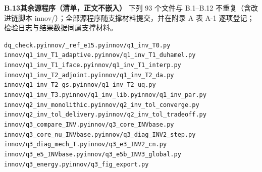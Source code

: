 \noindent\textbf{B.13\quad 其余源程序（清单，正文不嵌入）}
\noindent\footnotesize 下列 93 个文件与 B.1–B.12 不重复（含改进链脚本 innov/）；全部源程序随支撑材料提交，并在附录 A 表 A-1 逐项登记；检验日志与结果数据同属支撑材料。
\begingroup\raggedright\sloppy
\noindent \texttt{dq\_\allowbreak{}check.py}\quad \texttt{innov/\allowbreak{}\_\allowbreak{}ref\_\allowbreak{}e15.py}\quad \texttt{innov/\allowbreak{}q1\_\allowbreak{}inv\_\allowbreak{}T0.py}
\noindent \texttt{innov/\allowbreak{}q1\_\allowbreak{}inv\_\allowbreak{}T1\_\allowbreak{}adaptive.py}\quad \texttt{innov/\allowbreak{}q1\_\allowbreak{}inv\_\allowbreak{}T1\_\allowbreak{}duhamel.py}
\noindent \texttt{innov/\allowbreak{}q1\_\allowbreak{}inv\_\allowbreak{}T1\_\allowbreak{}iface.py}\quad \texttt{innov/\allowbreak{}q1\_\allowbreak{}inv\_\allowbreak{}T1\_\allowbreak{}interp.py}
\noindent \texttt{innov/\allowbreak{}q1\_\allowbreak{}inv\_\allowbreak{}T2\_\allowbreak{}adjoint.py}\quad \texttt{innov/\allowbreak{}q1\_\allowbreak{}inv\_\allowbreak{}T2\_\allowbreak{}da.py}
\noindent \texttt{innov/\allowbreak{}q1\_\allowbreak{}inv\_\allowbreak{}T2\_\allowbreak{}gs.py}\quad \texttt{innov/\allowbreak{}q1\_\allowbreak{}inv\_\allowbreak{}T2\_\allowbreak{}uq.py}
\noindent \texttt{innov/\allowbreak{}q1\_\allowbreak{}inv\_\allowbreak{}T3.py}\quad \texttt{innov/\allowbreak{}q1\_\allowbreak{}inv\_\allowbreak{}lib.py}\quad \texttt{innov/\allowbreak{}q1\_\allowbreak{}inv\_\allowbreak{}par.py}
\noindent \texttt{innov/\allowbreak{}q2\_\allowbreak{}inv\_\allowbreak{}monolithic.py}\quad \texttt{innov/\allowbreak{}q2\_\allowbreak{}inv\_\allowbreak{}tol\_\allowbreak{}converge.py}
\noindent \texttt{innov/\allowbreak{}q2\_\allowbreak{}inv\_\allowbreak{}tol\_\allowbreak{}delivery.py}\quad \texttt{innov/\allowbreak{}q2\_\allowbreak{}inv\_\allowbreak{}tol\_\allowbreak{}tradeoff.py}
\noindent \texttt{innov/\allowbreak{}q3\_\allowbreak{}compare\_\allowbreak{}INV.py}\quad \texttt{innov/\allowbreak{}q3\_\allowbreak{}core\_\allowbreak{}INVbase.py}
\noindent \texttt{innov/\allowbreak{}q3\_\allowbreak{}core\_\allowbreak{}nu\_\allowbreak{}INVbase.py}\quad \texttt{innov/\allowbreak{}q3\_\allowbreak{}diag\_\allowbreak{}INV2\_\allowbreak{}step.py}
\noindent \texttt{innov/\allowbreak{}q3\_\allowbreak{}diag\_\allowbreak{}mech\_\allowbreak{}T.py}\quad \texttt{innov/\allowbreak{}q3\_\allowbreak{}e3\_\allowbreak{}INV2\_\allowbreak{}cn.py}
\noindent \texttt{innov/\allowbreak{}q3\_\allowbreak{}e5\_\allowbreak{}INVbase.py}\quad \texttt{innov/\allowbreak{}q3\_\allowbreak{}e5b\_\allowbreak{}INV3\_\allowbreak{}global.py}
\noindent \texttt{innov/\allowbreak{}q3\_\allowbreak{}energy.py}\quad \texttt{innov/\allowbreak{}q3\_\allowbreak{}fig\_\allowbreak{}export.py}
